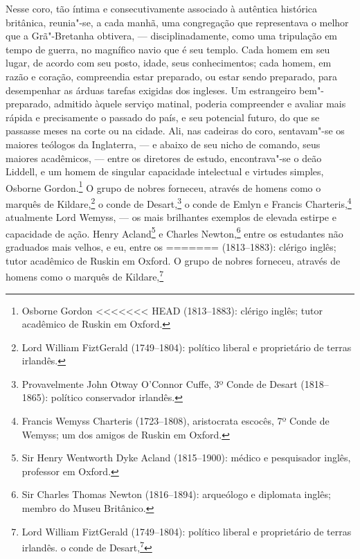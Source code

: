 {{{{{{{{{{{{{{{{{{{{{{{{{{{{{{{{{{{{{{{{{{{{{{{{{{{{{{{{{{{{{{{{{{{{{{{{{{{{{{{{{{{{{{{{%
Nesse coro, tão íntima e consecutivamente associado à autêntica
histórica britânica, reunia"-se, a cada manhã, uma congregação que
representava o melhor que a Grã"-Bretanha obtivera, --- disciplinadamente,
como uma tripulação em tempo de guerra, no magnífico navio que é seu
templo. Cada homem em seu lugar, de acordo com seu posto, idade, seus
conhecimentos; cada homem, em razão e coração, compreendia estar
preparado, ou estar sendo preparado, para desempenhar as árduas tarefas
exigidas dos ingleses. Um estrangeiro bem"-preparado, admitido àquele
serviço matinal, poderia compreender e avaliar mais rápida e
precisamente o passado do país, e seu potencial futuro, do que se
passasse meses na corte ou na cidade. Ali, nas cadeiras do coro,
sentavam"-se os maiores teólogos da Inglaterra, --- e abaixo de seu nicho
de comando, seus maiores acadêmicos, --- entre os diretores de estudo,
encontrava"-se o deão Liddell, e um homem de singular capacidade
intelectual e virtudes simples, Osborne Gordon.\footnote{Osborne Gordon
<<<<<<< HEAD
  (1813--1883): clérigo inglês; tutor acadêmico de Ruskin em Oxford.} O grupo de nobres forneceu, através de homens como o
marquês de Kildare,\footnote{Lord William FiztGerald (1749--1804):
  político liberal e proprietário de terras irlandês.} o
conde de Desart,\footnote{Provavelmente John Otway O'Connor Cuffe, 3º
  Conde de Desart (1818--1865): político conservador irlandês.} o conde de Emlyn e Francis Charteris,\footnote{Francis Wemyss
  Charteris (1723--1808), aristocrata escocês, 7º Conde de Wemyss; um dos
  amigos de Ruskin em Oxford.} atualmente Lord Wemyss,
--- os mais brilhantes exemplos de elevada estirpe e capacidade de ação.
Henry Acland\footnote{Sir Henry Wentworth Dyke Acland (1815--1900):
  médico e pesquisador inglês, professor em Oxford.} e
Charles Newton,\footnote{Sir Charles Thomas Newton (1816--1894):
  arqueólogo e diplomata inglês; membro do Museu Britânico.} entre os estudantes não graduados mais velhos, e eu, entre os
=======
  (1813--1883): clérigo inglês; tutor acadêmico de Ruskin em Oxford.  O grupo de nobres forneceu, através de homens como o
marquês de Kildare,\footnote{Lord William FiztGerald (1749--1804):
  político liberal e proprietário de terras irlandês.  o
conde de Desart,\footnote{Provavelmente John Otway O'Connor Cuffe, 3º
  Conde de Desart (1818--1865): político conservador irlandês.  o conde de Emlyn e Francis Charteris,\footnote{Francis Wemyss
  Charteris (1723--1808), aristocrata escocês, 7º Conde de Wemyss; um dos
  amigos de Ruskin em Oxford.  atualmente Lord Wemyss,
--- os mais brilhantes exemplos de elevada estirpe e capacidade de ação.
}}}}}}}}}}}}}}}}}}}}}}}}}}}}}}}}}}}}}}}}}}}}}}}}}}}}}}}}}}}}}}}}}}}}}}}}}}}}}}}}}}}}}}}}}}}
